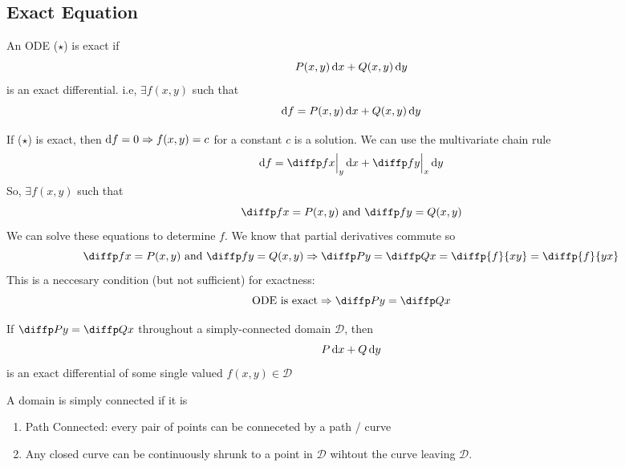 \documentclass{article}
\begin{document}
\subsection{Exact Equation}
\begin{defi}
    An ODE ($\star$) is exact if
    \[
        P(x, y)  \mathop{}\!\mathrm{d} x + Q(x, y) \mathop{}\!\mathrm{d} y
    \]
    is an exact differential. i.e, $\exists f(x, y)$ such that
    \[
        \mathop{}\!\mathrm{d} f = P(x, y)  \mathop{}\!\mathrm{d} x + Q(x, y) \mathop{}\!\mathrm{d} y
    \]
\end{defi}
If ($\star$) is exact, then $\mathop{}\!\mathrm{d} f = 0 \Rightarrow f(x, y) = c$ for a constant $c$ is a solution.
We can use the multivariate chain rule
\[
    \diffd f = \diffp fx \eval{y}{} \diffd x + \diffp fy \eval{x}{} \diffd y
\]
So, $\exists f(x, y)$ such that
\[
    \diffp fx = P(x, y) \text{ and } \diffp fy = Q(x, y)
\]
We can solve these equations to determine $f$. 
We know that partial derivatives commute so
\[
    \diffp fx = P(x, y) \text{ and } \diffp fy = Q(x, y) \Rightarrow \diffp Py = \diffp Qx = \diffp{f}{{x}{y}} = \diffp{f}{{y}{x}}
\]
This is a neccesary condition (but not sufficient) for exactness:
\[
    \text{ODE is exact} \Rightarrow \diffp Py = \diffp Qx
\]

\begin{thm}
    If $\diffp Py = \diffp Qx$ throughout a simply-connected domain $\mathcal{D}$, then
    \[
        P \mathop{}\!\mathrm{d} x + Q \mathop{}\!\mathrm{d} y  
    \]
    is an exact differential of some single valued $f(x, y) \in \mathcal{D}$
\end{thm}

\begin{defi}
    A domain is simply connected if it is
    \begin{enumerate}
        \item Path Connected: every pair of points can be conneceted by a path / curve
        \item Any closed curve can be continuously shrunk to a point in $\mathcal{D}$ wihtout the curve leaving $\mathcal{D}$.
    \end{enumerate}
\end{defi}
\end{document}
